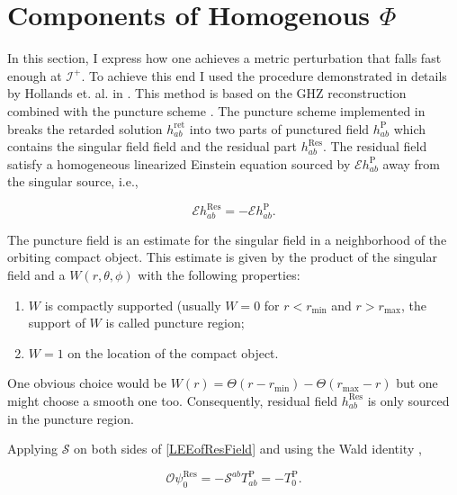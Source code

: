 \section{Components of Homogenous $\Phi$}

In this section, I express how one achieves a metric perturbation that falls fast enough at $\mathscr{I}^+$. To achieve this end I used the procedure demonstrated in details by Hollands et. al. in \cite{Hollands:2024iqp}.
This method is based on the GHZ reconstruction \cite{Green:2019nam} combined with the puncture scheme \cite{Toomani:2021jlo}.
The puncture scheme implemented in \cite{Toomani:2021jlo} breaks the retarded solution $h^\text{ret}_{ab}$ into two parts of punctured field $h^\text{P}_{ab}$ which contains the singular field field and the residual part $h^\text{Res}_{ab}$. The residual field satisfy a homogeneous linearized Einstein equation sourced by $\mathcal{E} h^\text{P}_{ab}$ away from the singular source, i.e.,

\begin{equation}\label{LEEofResField}
\mathcal{E} h^\text{Res}_{ab} = - \mathcal{E} h^\text{P}_{ab}.
\end{equation}

The puncture field is an estimate for the singular field in a neighborhood of the orbiting compact object. This estimate is given by the product of the singular field and a $W(r, \theta, \phi)$ with the following properties:

\begin{enumerate}
\item $W$ is compactly supported (usually $W = 0$ for $r < r_\text{min}$ and $r > r_\text{max}$, the support of $W$ is called puncture region;
\item $W = 1$ on the location of the compact object.
\end{enumerate}

One obvious choice would be $W(r) = \Theta(r - r_\text{min}) - \Theta(r_\text{max} - r)$ but one might choose a smooth one too. Consequently, residual field $h^\text{Res}_{ab}$ is only sourced in the puncture region.

Applying $\mathcal{S}$ on both sides of \eqref{LEEofResField} and using the Wald identity \cite{Wald identity paper},

\begin{equation}
\mathcal{O} \psi^\text{Res}_0 = - \mathcal{S}^{ab} T^\text{P}_{ab} = - T^\text{P}_0.
\end{equation}


